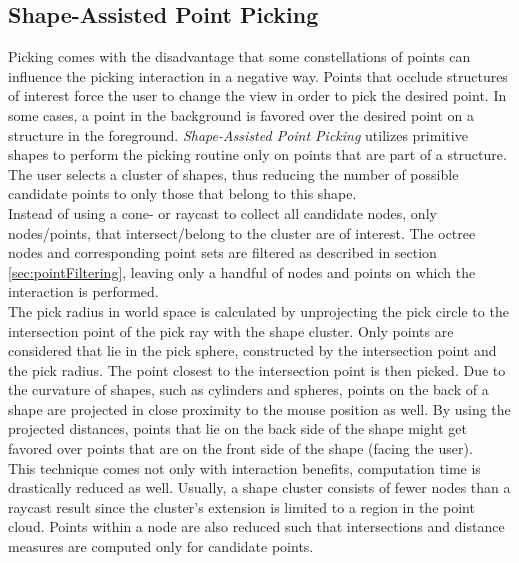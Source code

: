 \subsection{Shape-Assisted Point Picking}
\label {sec:picking_assisted}
Picking comes with the disadvantage that some constellations of points can influence the picking interaction in a negative way. Points that occlude structures of interest force the user to change the view in order to pick the desired point. In some cases, a point in the background is favored over the desired point on a structure in the foreground. \textit{Shape-Assisted Point Picking} utilizes primitive shapes to perform the picking routine only on points that are part of a structure. The user selects a cluster of shapes, thus reducing the number of possible candidate points to only those that belong to this shape. 
\\ 
Instead of using a cone- or raycast to collect all candidate nodes, only nodes/points, that intersect/belong to the cluster are of interest. The octree nodes and corresponding point sets are filtered as described in section \ref{sec:pointFiltering}, leaving only a handful of nodes and points on which the interaction is performed. 
\\
The pick radius in world space is calculated by unprojecting the pick circle to the intersection point of the pick ray with the shape cluster. Only points are considered that lie in the pick sphere, constructed by the intersection point and the pick radius. The point closest to the intersection point is then picked. Due to the curvature of shapes, such as cylinders and spheres, points on the back of a shape are projected in close proximity to the mouse position as well. By using the projected distances, points that lie on the back side of the shape might get favored over points that are on the front side of the shape (facing the user). 
\\
This technique comes not only with interaction benefits, computation time is drastically reduced as well. Usually, a shape cluster consists of fewer nodes than a raycast result since the cluster's extension is limited to a region in the point cloud. Points within a node are also reduced such that intersections and distance measures are computed only for candidate points. 
\\
